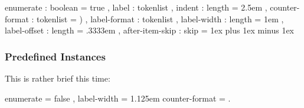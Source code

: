 \documentclass[load-preamble+]{cnltx-doc}
\begin{document}
\begin{sourcecode}
    {
      enumerate       : boolean   = true    ,
      label           : tokenlist           ,
      indent          : length    = 2.5em   ,
      counter-format  : tokenlist = \alph*) ,
      label-format    : tokenlist           ,
      label-width     : length    = 1em     ,
      label-offset    : length    = .3333em ,
      after-item-skip : skip      = 1ex plus 1ex minus 1ex
    }
\end{sourcecode}

\subsubsection{Predefined Instances}
This is rather brief this time:
\begin{sourcecode}
    {
      enumerate   = false ,
      label-width = 1.125em
    }
    { counter-format = \arabic*. }
\end{sourcecode}
\end{document}
